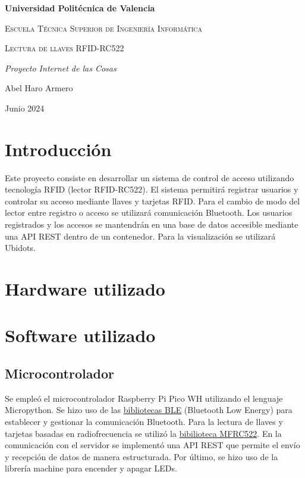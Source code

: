 \documentclass{article}
\begin{document}
\begin{titlepage}
\centering
{\bfseries\LARGE Universidad Politécnica de Valencia\par}
\vspace{1cm}
{\scshape\Large Escuela Técnica Superior de Ingeniería Informática\par}
\vspace{3cm}
{\scshape\Huge Lectura de llaves RFID-RC522 \par}
\vspace{3cm}
{\itshape\Large Proyecto Internet de las Cosas\par}
\vfill
{\Large Abel Haro Armero \par}
\vfill
{\Large Junio 2024 \par}
\date{}
\end{titlepage}



\tableofcontents


\section{Introducción}

Este proyecto consiste en desarrollar un sistema de control de acceso utilizando tecnología RFID (lector RFID-RC522). El sistema permitirá registrar usuarios y controlar su acceso mediante llaves y tarjetas RFID. Para el cambio de modo del lector entre registro o acceso se utilizará comunicación Bluetooth. Los usuarios registrados y los accesos se mantendrán en una base de datos accesible mediante una API REST dentro de un contenedor. Para la visualización se utilizará Ubidots.

\section{Hardware utilizado}

\section{Software utilizado}
\subsection{Microcontrolador}
Se empleó el microcontrolador Raspberry Pi Pico WH utilizando el lenguaje Micropython. Se hizo uso de las \href{https://github.com/micropython/micropython/tree/master/examples/bluetooth}{bibliotecas BLE} (Bluetooth Low Energy) para establecer y gestionar la comunicación Bluetooth. Para la lectura de llaves y tarjetas basadas en radiofrecuencia se utilizó la \href{https://github.com/danjperron/micropython-mfrc522/blob/master/mfrc522.py}{bibilioteca MFRC522}. En la comunicación con el servidor se implementó una API REST que permite el envío y recepción de datos de manera estructurada. Por último, se hizo uso de la librería machine para encender y apagar LEDs.
\end{document}
